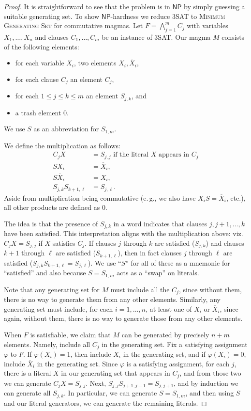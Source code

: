 \documentclass{article}
\newcommand{\algprobm}[1]{\textsc{#1}\xspace}
\newcommand*{\ComplexityClass}[1]{\ensuremath{\mathsf{#1}}\xspace}
\newcommand*{\NP}{\ComplexityClass{NP}}
\begin{document}
\begin{proof}
It is straightforward to see that the problem is in \NP by simply guessing a suitable generating set. To show \NP-hardness
we reduce \algprobm{3SAT} to \algprobm{Minimum Generating Set} for commutative magmas. Let $F=\bigwedge_{j=1}^m C_j$ 
with variables $X_1, \dots, X_n$ and clauses $C_1, \dots, C_m$ be an instance of \algprobm{3SAT}. Our magma $M$ consists of the following elements: 
\begin{itemize}
\item for each variable $X_i$, two elements $X_i, \overline{X}_i$, 
\item for each clause $C_j$ an element $C_j$,
\item for each $1\leq j\leq k\leq m$ an element $S_{j,k}$, and 
\item a trash element $0$.
\end{itemize}
We use $S$ as an abbreviation for $S_{1,m}$. 

We define the multiplication as follows: 
\begin{align*}   
 C_j X &= S_{j,j} \text{ if the literal $X$ appears in $C_j$}\\
 S  X_i &= \overline{X}_i,\\ 
 S \overline{X}_i &= X_i, \\
  S_{j,k}S_{k+1,\ell}&= S_{j,\ell}.
\end{align*}
Aside from multiplication being commutative (e.\,g., we also have $X_i S = \overline{X}_i$, etc.), 
all other products are defined as $0$.

The idea is that the presence of $S_{j,k}$ in a word indicates that clauses $j,j+1,\dotsc,k$ have been satisfied. This interpretation aligns with the multiplication above: viz. $C_j X = S_{j,j}$ if $X$ satisfies $C_j$. If clauses $j$ through $k$ are satisfied ($S_{j,k}$) and clauses $k+1$ through $\ell$ are satisfied ($S_{k+1,\ell}$), then in fact clauses $j$ through $\ell$ are satisfied ($S_{j,k} S_{k+1,\ell} = S_{j,\ell}$). We use ``$S$'' for all of these as a mnemonic for ``satisfied'' and also because $S = S_{1,m}$ acts as a ``swap'' on literals.

Note that any generating set for $M$ must include all the $C_j$, since without them, there is no way to generate them from any other elements. Similarly, any generating set must include, for each $i=1,\dotsc,n$, at least one of $X_i$ or $\overline{X}_i$, since again, without them, there is no way to generate those from any other elements.

When $F$ is satisfiable, we claim that $M$ can be generated by precisely $n+m$ elements. Namely, include all $C_j$ in the generating set. Fix a satisfying assignment $\varphi$ to $F$. If $\varphi(X_i)=1$, then include $X_i$ in the generating set, and if $\varphi(X_i)=0$, include $\overline{X}_i$ in the generating set. Since $\varphi$ is a satisfying assignment, for each $j$, there is a literal $X$ in our generating set that appears in $C_j$, and from those two we can generate $C_j X = S_{j,j}$. Next, $S_{j,j} S_{j+1,j+1} = S_{j,j+1}$, and by induction we can generate all $S_{j,k}$. In particular, we can generate $S=S_{1,m}$, and then using $S$ and our literal generators, we can generate the remaining literals.


\end{proof}
\end{document}
